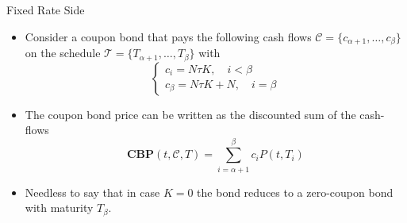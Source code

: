 \documentclass{beamer}
\begin{document}
\begin{frame}{Fixed Rate Side}
	\begin{itemize}
		\item<1-> Consider a coupon bond that pays the following cash flows $\mathcal{C}=\{c_{\alpha+1},\ldots,c_\beta\}$ on the schedule $\mathcal{T} = \{T_{\alpha+1},\ldots,T_\beta\}$ with 
		\begin{equation*}
			\begin{cases}
				c_i = N\tau K,\quad i<\beta \\
				c_\beta=N\tau K+N, \quad i=\beta	
			\end{cases}		
		\end{equation*}
		\item<2-> The coupon bond price can be written as the discounted sum of the cash-flows
		\begin{equation}
			\textbf{CBP}(t,\mathcal{C},T)=\sum_{i=\alpha+1}^{\beta}c_i P(t,T_i)
		\end{equation}
		\item<3-> Needless to say that in case $K=0$ the bond reduces to a zero-coupon bond with maturity $T_\beta$.
		
	\end{itemize}
\end{frame}

\end{document}

